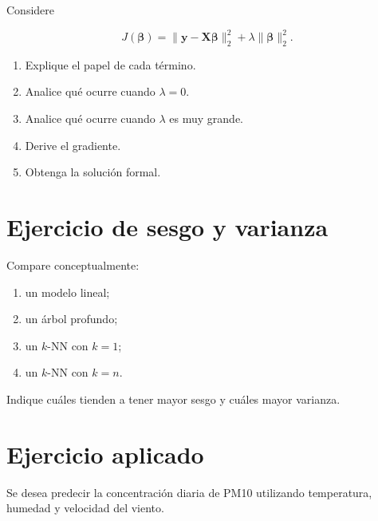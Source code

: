 \documentclass[
  spanish,
  10.5pt,
  letterpaper,
  DIV=11,
  numbers=noendperiod,
  oneside,
  open=any]{scrreprt}
\providecommand{\tightlist}{%
  \setlength{\itemsep}{0pt}\setlength{\parskip}{0pt}}
\theoremstyle{definition}
\theoremstyle{definition}
\theoremstyle{plain}
\theoremstyle{remark}
\begin{document}

Considere

\[
J(\boldsymbol{\beta})
=
\|
\mathbf{y}
-
\mathbf{X}\boldsymbol{\beta}
\|_2^2
+
\lambda
\|
\boldsymbol{\beta}
\|_2^2.
\]

\begin{enumerate}
\def\labelenumi{\arabic{enumi}.}
\tightlist
\item
  Explique el papel de cada término.
\item
  Analice qué ocurre cuando \(\lambda=0\).
\item
  Analice qué ocurre cuando \(\lambda\) es muy grande.
\item
  Derive el gradiente.
\item
  Obtenga la solución formal.
\end{enumerate}

\section*{Ejercicio de sesgo y
varianza}\label{ejercicio-de-sesgo-y-varianza}


Compare conceptualmente:

\begin{enumerate}
\def\labelenumi{\arabic{enumi}.}
\tightlist
\item
  un modelo lineal;
\item
  un árbol profundo;
\item
  un \(k\)-NN con \(k=1\);
\item
  un \(k\)-NN con \(k=n\).
\end{enumerate}

Indique cuáles tienden a tener mayor sesgo y cuáles mayor varianza.

\section*{Ejercicio aplicado}\label{ejercicio-aplicado-2}


Se desea predecir la concentración diaria de PM10 utilizando
temperatura, humedad y velocidad del viento.
\end{document}
